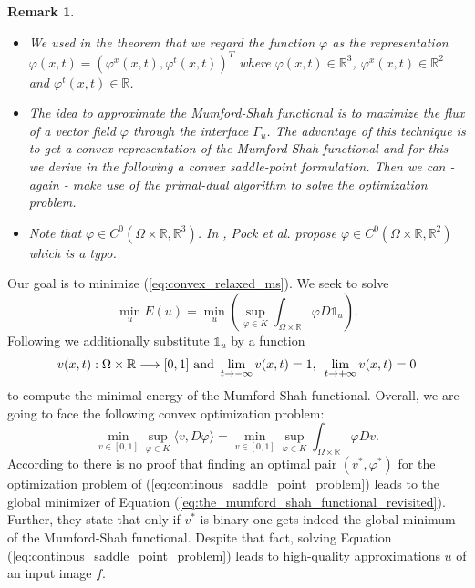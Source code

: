 \documentclass[abstracton]{scrreprt}
\newtheorem{remark}[theorem]{Remark}
\begin{document}
        \begin{remark}
            \begin{itemize}
                \item We used in the theorem that we regard the function $\varphi$ as the representation $\varphi(x, t) = \left( \varphi^{x}(x,t), \varphi^{t}(x,t) \right)^{T}$ where $\varphi(x,t) \in \mathbb{R}^{3}$, $\varphi^{x}(x,t) \in \mathbb{R}^{2}$ and $\varphi^{t}(x,t) \in \mathbb{R}$.
                \item The idea to approximate the Mumford-Shah functional is to maximize the flux of a vector field $\varphi$ through the interface $\Gamma_{u}$. The advantage of this technique is to get a convex representation of the Mumford-Shah functional and for this we derive in the following a convex saddle-point formulation. Then we can - again - make use of the primal-dual algorithm to solve the optimization problem.
                \item Note that $\varphi \in C^{0}(\Omega \times \mathbb{R}, \mathbb{R}^{3})$. In \cite{Pock-et-al-iccv09}, Pock et al. propose $\varphi \in C^{0}(\Omega \times \mathbb{R}, \mathbb{R}^{2})$ which is a typo.
            \end{itemize}
        \end{remark}
        Our goal is to minimize (\ref{eq:convex_relaxed_ms}). We seek to solve
            $$
                \min_{u} E(u) = \min_{u} \left( \sup_{\varphi \in K} \int_{\Omega \times \mathbb{R}} \varphi D\mathds{1}_{u} \right).
            $$
        Following \cite{Pock-et-al-iccv09} we additionally substitute $\mathds{1}_{u}$ by a function
            \begin{equation}
                v(x, t): \Omega \times \mathbb{R} \longrightarrow [0, 1] \,\, \textnormal{and} \,\, \lim_{t \rightarrow -\infty} v(x, t) = 1, \, \, \, \lim_{t \rightarrow +\infty} v(x, t) = 0
            \label{eq:generic_functions}
            \end{equation}
        to compute the minimal energy of the Mumford-Shah functional. Overall, we are going to face the following convex optimization problem:
            \begin{equation}
                \min_{v \in [0, 1]} \sup_{\varphi \in K} \langle v, D\varphi \rangle = \min_{v \in [0, 1]} \sup_{\varphi \in K} \int_{\Omega \times \mathbb{R}} \varphi Dv.
                \label{eq:continous_saddle_point_problem}
            \end{equation}
        According to \cite{Pock-et-al-iccv09} there is no proof that finding an optimal pair $(v^{\ast}, \varphi^{\ast})$ for the optimization problem of (\ref{eq:continous_saddle_point_problem}) leads to the global minimizer of Equation (\ref{eq:the_mumford_shah_functional_revisited}). Further, they state that only if $v^{\ast}$ is binary one gets indeed the global minimum of the Mumford-Shah functional. Despite that fact, solving Equation (\ref{eq:continous_saddle_point_problem}) leads to high-quality approximations $u$ of an input image $f$.
\end{document}
